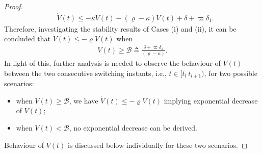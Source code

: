 \documentclass[AMA,STIX1COL,sort, compress]{WileyNJD-v2}
\begin{document}
\begin{proof}
	\begin{align}
	&\dot{V}(t) \leq - \kappa V(t) - (\varrho - \kappa)V(t) + \delta + \varpi \delta_1 . \label{part 10}
	\end{align}
	Therefore, investigating the stability results of Cases (i) and (ii), it can be concluded that $\dot{V}(t) \leq - \varrho V(t) $ when
	\begin{align}
	V(t) \geq \mathcal{B} \triangleq \frac{\delta + \varpi \delta_1}{(\varrho - \kappa)}.
	\end{align}
	In light of this, further analysis is needed to observe the behaviour of $V(t)$ between the two consecutive switching instants, i.e., $t \in [t_{l}~t_{l+1})$, for two possible scenarios: 
	\begin{itemize}
		\item[\textbf{(i)}] when $V(t) \geq \mathcal{B}$, we have $\dot{V}(t) \leq - \varrho V(t) $ implying exponential decrease of $V(t)$;
		\item[\textbf{(ii)}] when $V(t) <\mathcal{B}$, no exponential decrease can be derived.
	\end{itemize}
	Behaviour of $V(t)$ is discussed below individually for these two scenarios.
	

\end{proof}
\end{document}

